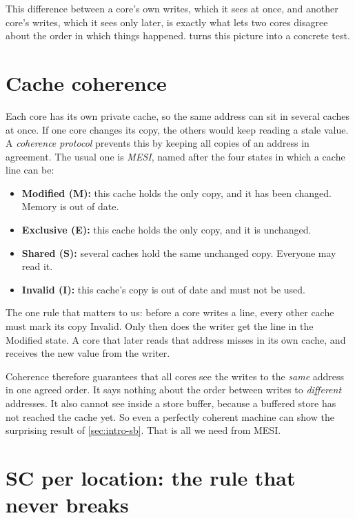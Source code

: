 This difference between a core's own writes, which it sees at once, and another core's writes, which it sees only later, is exactly what lets two cores disagree about the order in which things happened.  turns this picture into a concrete test.

\section{Cache coherence}
\label{sec:coherence}

Each core has its own private cache, so the same address can sit in several caches at once. If one core changes its copy, the others would keep reading a stale value. A \emph{coherence protocol} prevents this by keeping all copies of an address in agreement. The usual one is \emph{MESI}, named after the four states in which a cache line can be:

\begin{itemize}
  \item \textbf{Modified (M):} this cache holds the only copy, and it has been changed. Memory is out of date.
  \item \textbf{Exclusive (E):} this cache holds the only copy, and it is unchanged.
  \item \textbf{Shared (S):} several caches hold the same unchanged copy. Everyone may read it.
  \item \textbf{Invalid (I):} this cache's copy is out of date and must not be used.
\end{itemize}

The one rule that matters to us: before a core writes a line, every other cache must mark its copy Invalid. Only then does the writer get the line in the Modified state. A core that later reads that address misses in its own cache, and receives the new value from the writer.

Coherence therefore guarantees that all cores see the writes to the \emph{same} address in one agreed order. It says nothing about the order between writes to \emph{different} addresses. It also cannot see inside a store buffer, because a buffered store has not reached the cache yet. So even a perfectly coherent machine can show the surprising result of \cref{sec:intro-sb}. That is all we need from MESI.

\section{SC per location: the rule that never breaks}
\label{sec:scloc}


